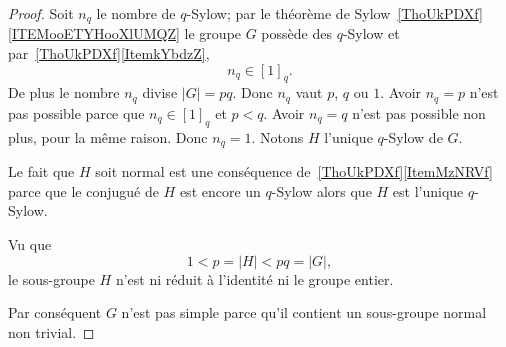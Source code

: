 \begin{proof}
    Soit \( n_q\) le nombre de \( q\)-Sylow; par le théorème de Sylow~\ref{ThoUkPDXf}\ref{ITEMooETYHooXlUMQZ} le groupe \( G\) possède des \( q\)-Sylow et par~\ref{ThoUkPDXf}\ref{ItemkYbdzZ},
    \begin{equation}
        n_q\in[1]_q.
    \end{equation}
    De plus le nombre \( n_q\) divise \( | G |=pq\). Donc \( n_q\) vaut \( p\), \( q\) ou \( 1\). Avoir \( n_q=p\) n'est pas possible parce que \( n_q\in[1]_q\) et \( p<q\). Avoir \( n_q=q\) n'est pas possible non plus, pour la même raison. Donc \( n_q=1\). Notons \( H\) l'unique \( q\)-Sylow de \( G\).

    Le fait que \( H\) soit normal est une conséquence de~\ref{ThoUkPDXf}\ref{ItemMzNRVf} parce que le conjugué de \( H\) est encore un \( q\)-Sylow alors que \( H\) est l'unique \( q\)-Sylow.

    Vu que
    \begin{equation}
        1<p=| H |<pq=| G |,
    \end{equation}
    le sous-groupe \( H \) n'est ni réduit à l'identité ni le groupe entier.

    Par conséquent \( G\) n'est pas simple parce qu'il contient un sous-groupe normal non trivial.
\end{proof}

